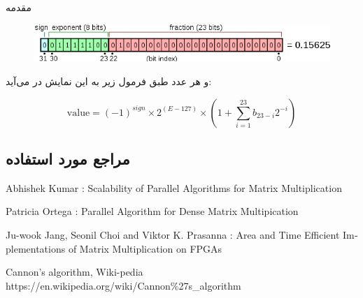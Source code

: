 \documentclass[]{article}
\begin{document}
\begin{section-container}{مقدمه}
\begin{figure}[h]
	\centering
	\includegraphics[width=0.8\linewidth]{source/float_example.png}
\end{figure}

و هر عدد طبق فرمول زیر به این نمایش در می‌آید:

\begin{equation}
\text{value} = (-1)^{sign} \times 2^{(E-127)} \times (1 + \sum_{i=1}^{23}b_{23-i}2^{-i})
\end{equation}
 

\subsection{مراجع مورد استفاده}

\begin{latin}
\begin{thebibliography}{}
	
	Abhishek Kumar : Scalability of Parallel Algorithms for Matrix Multiplication
	
	Patricia Ortega : Parallel Algorithm for Dense Matrix Multipication
	
	Ju-wook Jang, Seonil Choi and Viktor K. Prasanna : Area and Time Efficient Implementations of Matrix Multiplication on FPGAs
	
	Cannon's algorithm, Wiki-pedia\\ https://en.wikipedia.org/wiki/Cannon\%27s\_algorithm
	
	
\end{thebibliography}
\end{latin}

\end{section-container}
\end{document}
